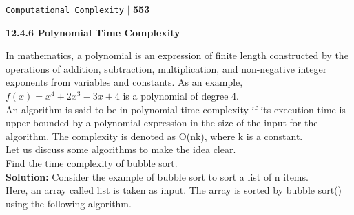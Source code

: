 \documentclass[12pt]{article}
\begin{document}
\begin{flushright}
 \texttt{Computational Complexity} \hspace*{0.10cm}\textbf{$|$} \textbf{553}\hspace*{0.5cm}
\end{flushright}

\vspace*{0.5cm}
\large{
\textbf{12.4.6 Polynomial Time Complexity}\\
}

\vspace*{0.2cm}
\small{In mathematics, a polynomial is an expression of finite length constructed by the operations of addition,
subtraction, multiplication, and non-negative integer exponents from variables and constants. As an
example, $f(x) = x^{4} + 2x^{3} - 3x + 4$ is a polynomial of degree $4$.\\
\hspace*{0.5cm} An algorithm is said to be in polynomial time complexity if its execution time is upper bounded by
a polynomial expression in the size of the input for the algorithm. The complexity is denoted as O(nk),
where k is a constant.\\
\hspace*{0.5cm} Let us discuss some algorithms to make the idea clear.\\
}
\vspace*{0.3cm}
\hspace*{0.1cm} Find the time complexity of bubble sort.\\

\textbf{Solution:} Consider the example of bubble sort to sort a list of n items.\\
Here, an array called list is taken as input. The array is sorted by bubble sort() using the following
algorithm.\\
\end{document}
